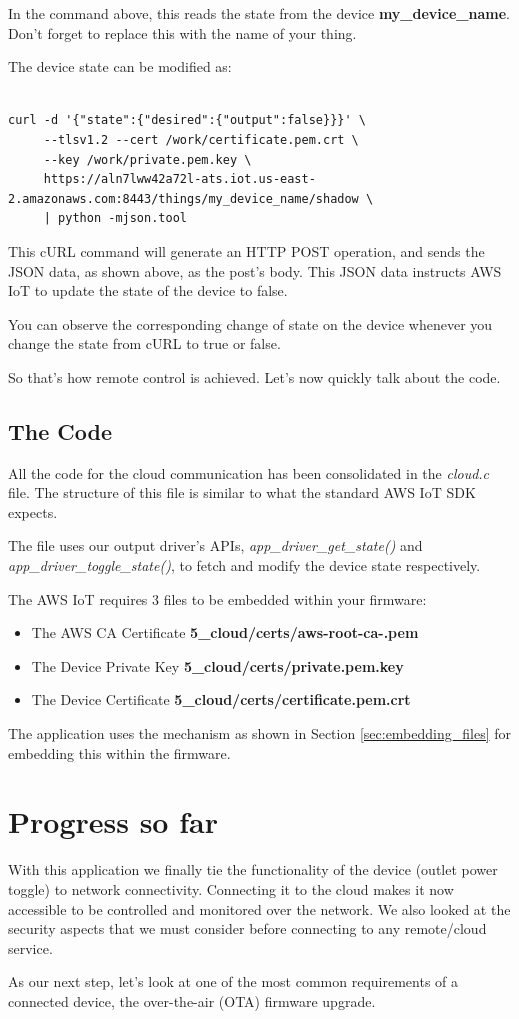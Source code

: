 \documentclass[main.tex]{subfiles}
\begin{document}
In the command above, this reads the state from the device \textbf{my\_device\_name}. Don't forget to replace this with the name of your thing.

The device state can be modified as:
\begin{verbatim}

curl -d '{"state":{"desired":{"output":false}}}' \ 
     --tlsv1.2 --cert /work/certificate.pem.crt \ 
     --key /work/private.pem.key \ 
     https://aln7lww42a72l-ats.iot.us-east-2.amazonaws.com:8443/things/my_device_name/shadow \ 
     | python -mjson.tool
\end{verbatim}

This cURL command will generate an HTTP POST operation, and sends the JSON data, as shown above, as the post's body. This JSON data instructs AWS IoT to update the state of the device to false.

You can observe the corresponding change of state on the device whenever you change the state from cURL to true or false.

So that's how remote control is achieved. Let's now quickly talk about the code.

\subsection{The Code}\index{The Code}
All the code for the cloud communication has been consolidated in the \textit{cloud.c} file. The structure of this file is similar to what the standard AWS IoT SDK expects.

The file uses our output driver's APIs, \textit{app\_driver\_get\_state()} and \textit{app\_driver\_toggle\_state()}, to fetch and modify the device state respectively.

The AWS IoT requires 3 files to be embedded within your firmware:
\begin{itemize}
        \item The AWS CA Certificate  \textbf{5\_cloud/certs/aws-root-ca-.pem}
        \item The Device Private Key  \textbf{5\_cloud/certs/private.pem.key}
        \item The Device Certificate  \textbf{5\_cloud/certs/certificate.pem.crt}
\end{itemize}
The application uses the mechanism as shown in Section \ref{sec:embedding_files} for embedding this within the firmware.

\section{Progress so far}\index{Progress so far}
With this application we finally tie the functionality of the device (outlet power toggle) to network connectivity. Connecting it to the cloud makes it now accessible to be controlled and monitored over the network. We also looked at the security aspects that we must consider before connecting to any remote/cloud service.

As our next step, let's look at one of the most common requirements of a connected device, the over-the-air (OTA) firmware upgrade.
\end{document}
